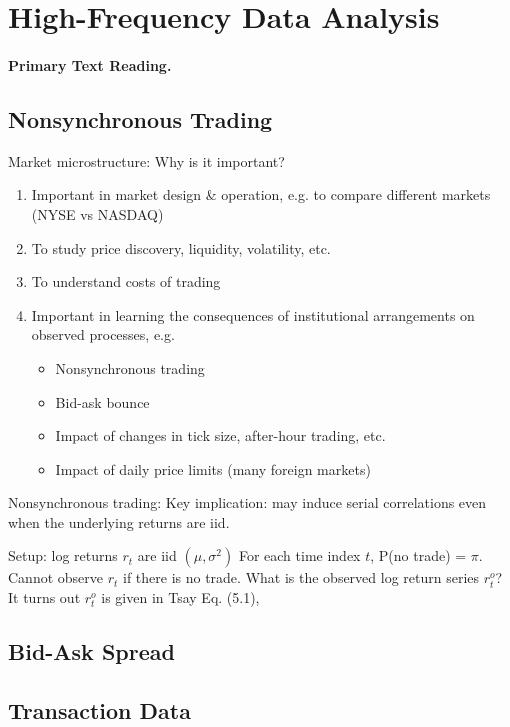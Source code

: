 \section{High-Frequency Data Analysis}\label{High-Frequency}
\paragraph{Primary Text Reading.} 

\subsection{Nonsynchronous Trading}

Market microstructure: Why is it important? 
\begin{enumerate}
\item Important in market design \& operation, e.g. to compare different markets (NYSE vs NASDAQ) 
\item To study price discovery, liquidity, volatility, etc. 
\item To understand costs of trading 
\item Important in learning the consequences of institutional arrangements on observed processes, e.g. 
\begin{itemize}
\item Nonsynchronous trading 
\item Bid-ask bounce 
\item Impact of changes in tick size, after-hour trading, etc. 
\item Impact of daily price limits (many foreign markets) 
\end{itemize}
\end{enumerate}

Nonsynchronous trading: 
Key implication: may induce serial correlations even when the underlying returns are iid. 

Setup: log returns ${r_t}$ are iid $(\mu, \sigma^2)$ 
For each time index $t$, P(no trade) = $\pi$. 
Cannot observe $r_t$ if there is no trade. 
What is the observed log return series $r^o_t$? 
It turns out $r^o_t$ is given in Tsay Eq. (5.1), 

\subsection{Bid-Ask Spread}

\subsection{Transaction Data}

